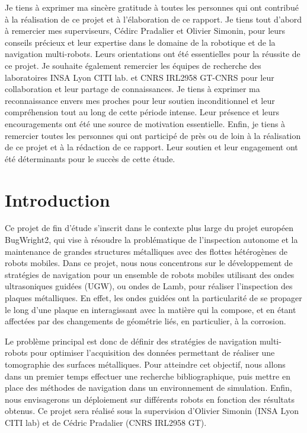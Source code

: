 \documentclass[francais,RandD]{rapportPFE}
\begin{document}
	\begin{remerciements}
		Je tiens à exprimer ma sincère gratitude à toutes les personnes qui ont contribué à la réalisation de ce projet et à l'élaboration de ce rapport.
		Je tiens tout d'abord à remercier mes superviseurs, Cédirc Pradalier et Olivier Simonin, pour leurs conseils précieux et leur expertise dans le domaine de la robotique et de la navigation multi-robots. Leurs orientations ont été essentielles pour la réussite de ce projet.
		Je souhaite également remercier les équipes de recherche des laboratoires INSA Lyon CITI lab. et CNRS IRL2958 GT-CNRS pour leur collaboration et leur partage de connaissances.
		Je tiens à exprimer ma reconnaissance envers mes proches pour leur soutien inconditionnel et leur compréhension tout au long de cette période intense.
		Leur présence et leurs encouragements ont été une source de motivation essentielle.
		Enfin, je tiens à remercier toutes les personnes qui ont participé de près ou de loin à la réalisation de ce projet et à la rédaction de ce rapport.
		Leur soutien et leur engagement ont été déterminants pour le succès de cette étude.
	\end{remerciements}
	\setcounter{tocdepth}{3}
	\listoffigures
	\clearpage
	\listoftables
	\clearpage
	\listofalgorithms
	\clearpage
	\tableofcontents
	\cleardoublepage
	\section{Introduction}
		Ce projet de fin d'étude s'inscrit dans le contexte plus large du projet européen BugWright2, qui vise à résoudre la problématique de l'inspection autonome et la maintenance de grandes structures métalliques avec des flottes hétérogènes de robots mobiles.
		Dans ce projet, nous nous concentrons sur le développement de stratégies de navigation pour un ensemble de robots mobiles utilisant des ondes ultrasoniques guidées (UGW), ou ondes de Lamb, pour réaliser l'inspection des plaques métalliques.
		En effet, les ondes guidées ont la particularité de se propager le long d'une plaque en interagissant avec la matière qui la compose, et en étant affectées par des changements de géométrie liés, en particulier, à la corrosion.

		Le problème principal est donc de définir des stratégies de navigation multi-robots pour optimiser l'acquisition des données permettant de réaliser une tomographie des surfaces métalliques.
		Pour atteindre cet objectif, nous allons dans un premier temps effectuer une recherche bibliographique, puis mettre en place des méthodes de navigation dans un environnement de simulation.
		Enfin, nous envisagerons un déploiement sur différents robots en fonction des résultats obtenus.
		Ce projet sera réalisé sous la supervision d'Olivier Simonin (INSA Lyon CITI lab) et de Cédric Pradalier (CNRS IRL2958 GT).
\end{document}
